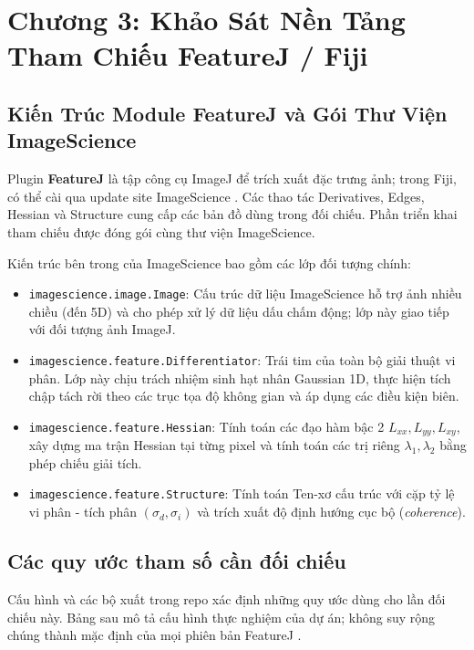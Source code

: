 \documentclass[conference]{IEEEtran}
\begin{document}


\section{Chương 3: Khảo Sát Nền Tảng Tham Chiếu FeatureJ / Fiji}

\subsection{Kiến Trúc Module FeatureJ và Gói Thư Viện ImageScience}
Plugin \textbf{FeatureJ} là tập công cụ ImageJ để trích xuất đặc trưng ảnh; trong Fiji, có thể cài qua update site ImageScience \cite{meijeringFeatureJ}. Các thao tác Derivatives, Edges, Hessian và Structure cung cấp các bản đồ dùng trong đối chiếu. Phần triển khai tham chiếu được đóng gói cùng thư viện ImageScience.

Kiến trúc bên trong của ImageScience bao gồm các lớp đối tượng chính:
\begin{itemize}
    \item \texttt{imagescience.image.Image}: Cấu trúc dữ liệu ImageScience hỗ trợ ảnh nhiều chiều (đến 5D) và cho phép xử lý dữ liệu dấu chấm động; lớp này giao tiếp với đối tượng ảnh ImageJ.
    \item \texttt{imagescience.feature.Differentiator}: Trái tim của toàn bộ giải thuật vi phân. Lớp này chịu trách nhiệm sinh hạt nhân Gaussian 1D, thực hiện tích chập tách rời theo các trục tọa độ không gian và áp dụng các điều kiện biên.
    \item \texttt{imagescience.feature.Hessian}: Tính toán các đạo hàm bậc 2 $L_{xx}, L_{yy}, L_{xy}$, xây dựng ma trận Hessian tại từng pixel và tính toán các trị riêng $\lambda_1, \lambda_2$ bằng phép chiếu giải tích.
    \item \texttt{imagescience.feature.Structure}: Tính toán Ten-xơ cấu trúc với cặp tỷ lệ vi phân - tích phân $(\sigma_d, \sigma_i)$ và trích xuất độ định hướng cục bộ (\textit{coherence}).
\end{itemize}

\subsection{Các quy ước tham số cần đối chiếu}
Cấu hình và các bộ xuất trong repo xác định những quy ước dùng cho lần đối chiếu này. Bảng sau mô tả cấu hình thực nghiệm của dự án; không suy rộng chúng thành mặc định của mọi phiên bản FeatureJ \cite{xlaRepository}.
\end{document}
